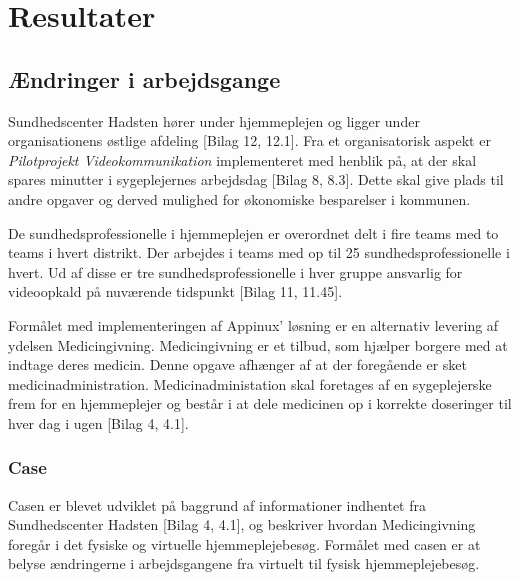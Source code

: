 \section{Resultater}


\subsection{Ændringer i arbejdsgange}
Sundhedscenter Hadsten hører under hjemmeplejen og ligger under organisationens østlige afdeling [Bilag 12, 12.1]. Fra et organisatorisk aspekt er \textit{Pilotprojekt Videokommunikation} implementeret med henblik på, at der skal spares minutter i sygeplejernes arbejdsdag [Bilag 8, 8.3]. Dette skal give plads til andre opgaver og derved mulighed for økonomiske besparelser i kommunen. 

De sundhedsprofessionelle i hjemmeplejen er overordnet delt i fire teams med to teams i hvert distrikt. Der arbejdes i teams med op til 25 sundhedsprofessionelle i hvert. Ud af disse er tre sundhedsprofessionelle i hver gruppe ansvarlig for videoopkald på nuværende tidspunkt [Bilag 11, 11.45].

Formålet med implementeringen af Appinux’ løsning er en alternativ levering af ydelsen Medicingivning.  Medicingivning er et tilbud, som hjælper borgere med at indtage deres medicin. Denne opgave afhænger af at der foregående er sket medicinadministration. Medicinadministation skal foretages af en sygeplejerske frem for en hjemmeplejer og består i at dele medicinen op i korrekte doseringer til hver dag i ugen [Bilag 4, 4.1].


\subsubsection{Case}
Casen er blevet udviklet på baggrund af informationer indhentet fra Sundhedscenter Hadsten [Bilag 4, 4.1], og beskriver hvordan Medicingivning foregår i det fysiske og virtuelle hjemmeplejebesøg.
Formålet med casen er at belyse ændringerne i arbejdsgangene fra virtuelt til fysisk hjemmeplejebesøg.

